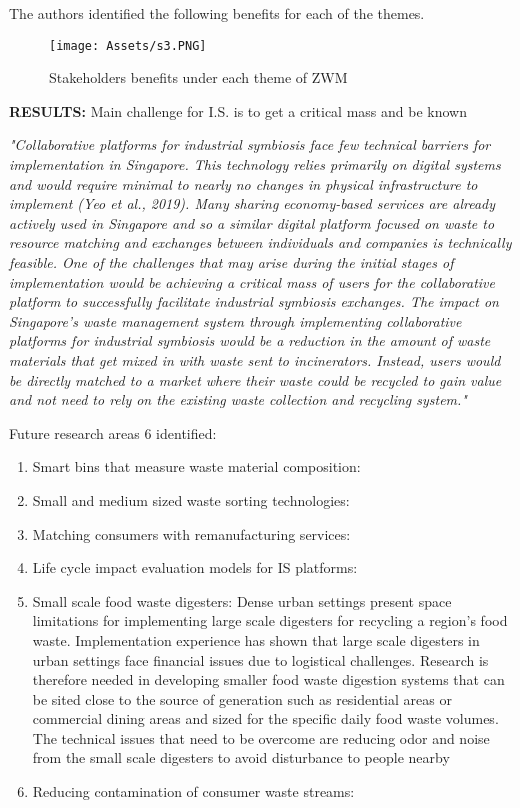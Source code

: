 The authors identified the following benefits for each of the themes.
\begin{figure}[h!]
    \centering
    \texttt{[image: Assets/s3.PNG]}
    \caption{Stakeholders benefits under each theme of ZWM}
    \label{fig:ZWM}
\end{figure}

\textbf{RESULTS:} Main challenge for I.S. is to get a critical mass and be known\par

\textit{"Collaborative platforms for industrial symbiosis face few technical
barriers for implementation in Singapore. This technology relies primarily on digital systems and would require minimal to nearly no changes in physical infrastructure to implement (Yeo et al., 2019). Many sharing economy-based services are already actively used in Singapore and so a similar digital platform focused on waste to resource matching and exchanges between individuals and companies is technically feasible. One of the challenges that may arise during the initial stages of implementation would be achieving a critical mass of users for the collaborative platform to successfully facilitate industrial symbiosis exchanges. The impact on Singapore’s waste management system through implementing collaborative platforms for industrial symbiosis would be a reduction in the amount of waste materials that get mixed in with waste sent to incinerators. Instead, users would be directly matched to a market where their waste could be recycled to gain value and not need to rely on the existing waste collection and recycling system."} \par

Future research areas  6 identified:
\begin{enumerate}
    \item Smart bins that measure waste material composition:  
    \item Small and medium sized waste sorting technologies: 
    \item Matching consumers with remanufacturing services:  
    \item Life cycle impact evaluation models for IS platforms:
    \item Small scale food waste digesters: Dense urban settings present space limitations for implementing large scale digesters for recycling a region’s food waste. Implementation experience has shown that large scale digesters in urban settings face financial issues due to logistical challenges. Research is therefore needed in developing smaller food waste digestion systems that can be sited close to the source of generation such as residential areas or commercial dining areas and sized for the specific daily food waste volumes. The technical issues that need to be overcome are reducing odor and noise from the small scale digesters to avoid disturbance to people nearby 
    \item Reducing contamination of consumer waste streams: 
\end{enumerate}\par


